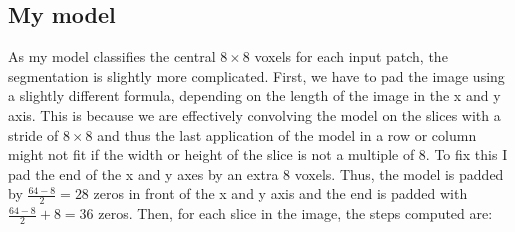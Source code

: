 \documentclass[12pt,a4paper,twoside,openright]{report}
\begin{document}
\subsection{My model}
As my model classifies the central $8 \times 8$ voxels for each input patch, the segmentation is slightly more complicated. First, we have to pad the image using a slightly different formula, depending on the length of the image in the x and y axis. This is because we are effectively convolving the model on the slices with a stride of $8 \times 8$ and thus the last application of the model in a row or column might not fit if the width or height of the slice is not a multiple of 8. To fix this I pad the end of the x and y axes by an extra 8 voxels. Thus, the model is padded by $\frac{64 - 8}{2} = 28$ zeros in front of the x and y axis and the end is padded with $\frac{64 -8}{2} + 8 = 36$ zeros. Then, for each slice in the image, the steps computed are:
\end{document}
